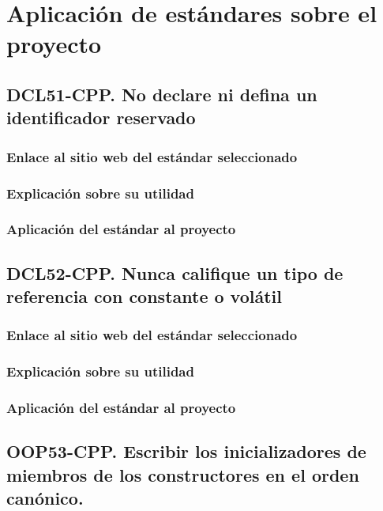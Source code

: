 \section{Aplicación de estándares sobre el proyecto}

	\subsection{DCL51-CPP. No declare ni defina un identificador reservado}

		\subsubsection{Enlace al sitio web del estándar seleccionado}
		
		\subsubsection{Explicación sobre su utilidad}
		
		\subsubsection{Aplicación del estándar al proyecto}

	\subsection{DCL52-CPP. Nunca califique un tipo de referencia con constante o volátil}
	
		\subsubsection{Enlace al sitio web del estándar seleccionado}
		
		\subsubsection{Explicación sobre su utilidad}
		
		\subsubsection{Aplicación del estándar al proyecto}

	\subsection{OOP53-CPP. Escribir los inicializadores de miembros de los constructores en el orden canónico.}
	
